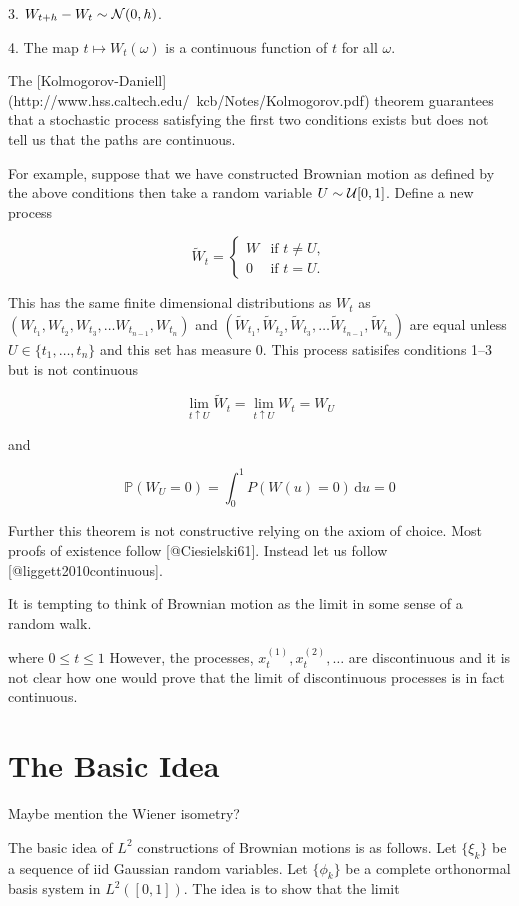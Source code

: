 \documentclass{article}
\begin{document}
3. $W_{t+h} - W_t \sim {\cal{N}}(0,h)$.

4. The map $t \mapsto W_t(\omega)$ is a continuous function of $t$ for
all $\omega$.

The
[Kolmogorov-Daniell](http://www.hss.caltech.edu/~kcb/Notes/Kolmogorov.pdf)
theorem guarantees that a stochastic process satisfying the first two
conditions exists but does not tell us that the paths are
continuous.

For example, suppose that we have constructed Brownian motion as
defined by the above conditions then take a random variable $U \sim {\cal{U}}[0,1]$. Define a new process

$$
\tilde{W}_t =
  \begin{cases}
    W & \text{if } t \neq U, \\
    0 & \text{if } t = U.
  \end{cases}
$$

This has the same finite dimensional distributions as $W_t$ as
$(W_{t_1}, W_{t_2}, W_{t_3}, \ldots W_{t_{n-1}}, W_{t_n})$ and
$(\tilde{W}_{t_1}, \tilde{W}_{t_2}, \tilde{W}_{t_3}, \ldots
\tilde{W}_{t_{n-1}}, \tilde{W}_{t_n})$ are equal unless $U \in \{t_1,
\ldots, t_n\}$ and this set has measure 0. This process satisifes
conditions 1--3 but is not continuous

$$
\lim_{t \uparrow U} \tilde{W}_t = \lim_{t \uparrow U} W_t = W_U
$$

and

$$
\mathbb{P}(W_U = 0) = \int_0^1 P(W(u)=0)\,\mathrm du=0
$$

Further this theorem is not constructive relying on the axiom of
choice. Most proofs of existence follow [@Ciesielski61]. Instead let
us follow [@liggett2010continuous].

It is tempting to think of Brownian motion as the limit in some sense
of a random walk.


where $0 \le t \le 1$ However, the processes, $x_t^{(1)}, x_t^{(2)},
\ldots$ are discontinuous and it is not clear how one would prove that
the limit of discontinuous processes is in fact continuous.

\section{The Basic Idea}

Maybe mention the Wiener isometry?

The basic idea of $L^2$ constructions of Brownian motions is as
follows. Let $\{\xi_k\}$ be a sequence of iid Gaussian random
variables. Let $\{\phi_k\}$ be a complete orthonormal basis system in
$L^2([0,1])$. The idea is to show that the limit
\end{document}
